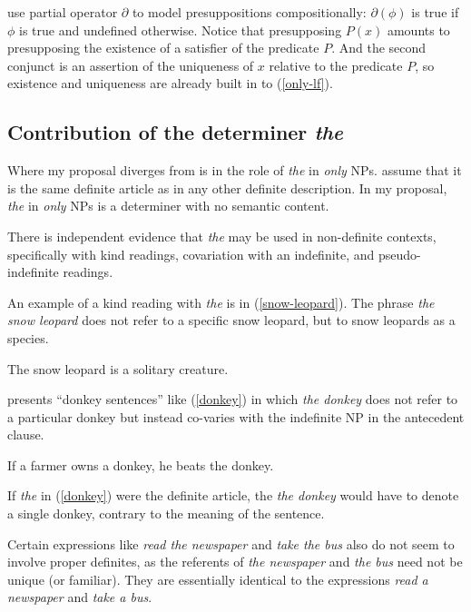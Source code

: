 \citeauthor{cb2015} use  partial operator $\partial$ to model presuppositions compositionally: $\partial(\phi)$ is true if $\phi$ is true and undefined otherwise. Notice that presupposing $P(x)$ amounts to presupposing the existence of a satisfier of the predicate $P$. And the second conjunct is an assertion of the uniqueness of $x$ relative to the predicate $P$, so existence and uniqueness are already built in to (\ref{only-lf}).

\subsection{Contribution of the determiner \textit{the}}
Where my proposal diverges from  is in the role of \textit{the} in \textit{only} NPs. \citeauthor{cb2015} assume that it is the same definite article as in any other definite description. In my proposal, \textit{the} in \textit{only} NPs is a determiner with no semantic content.

There is independent evidence that \textit{the} may be used in non-definite contexts, specifically with kind readings, covariation with an indefinite, and pseudo-indefinite readings.

An example of a kind reading with \textit{the} is in (\ref{snow-leopard}). The phrase \textit{the snow leopard} does not refer to a specific snow leopard, but to snow leopards as a species.

\begin{exe}
	\ex \label{snow-leopard} The snow leopard is a solitary creature.
\end{exe}

\citet{schwarz09} presents ``donkey sentences'' like (\ref{donkey}) in which \textit{the donkey} does not refer to a particular donkey but instead co-varies with the indefinite NP in the antecedent clause.

\begin{exe}
	\ex \label{donkey} If a farmer owns a donkey, he beats the donkey.
\end{exe}

If \textit{the} in (\ref{donkey}) were the definite article, the \textit{the donkey} would have to denote a single donkey, contrary to the meaning of the sentence.

Certain expressions like \textit{read the newspaper} and \textit{take the bus} also do not seem to involve proper definites, as the referents of \textit{the newspaper} and \textit{the bus} need not be unique (or familiar). They are essentially identical to the expressions \textit{read a newspaper} and \textit{take a bus}.

